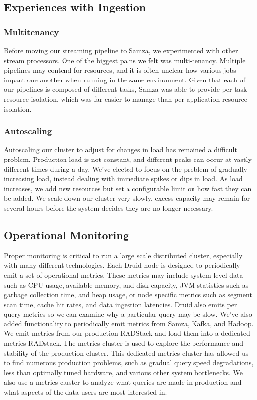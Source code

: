 \documentclass{vldb}
\begin{document}
\subsection{Experiences with Ingestion}
\subsubsection{Multitenancy}
Before moving our streaming pipeline to Samza, we experimented with other
stream processors. One of the biggest pains we felt was multi-tenancy. Multiple
pipelines may contend for resources, and it is often unclear how various jobs
impact one another when running in the same environment. Given that each of our
pipelines is composed of different tasks, Samza was able to provide per task
resource isolation, which was far easier to manage than per application
resource isolation.

\subsubsection{Autoscaling}
Autoscaling our cluster to adjust for changes in load has remained a difficult
problem. Production load is not constant, and different peaks can occur at
vastly different times during a day. We’ve elected to focus on the problem of
gradually increasing load, instead dealing with immediate spikes or dips in
load. As load increases, we add new resources but set a configurable limit on
how fast they can be added. We scale down our cluster very slowly, excess
capacity may remain for several hours before the system decides they are no
longer necessary.

\subsection{Operational Monitoring}
Proper monitoring is critical to run a large scale distributed cluster,
especially with many different technologies. Each Druid node is designed to
periodically emit a set of operational metrics. These metrics may include
system level data such as CPU usage, available memory, and disk capacity, JVM
statistics such as garbage collection time, and heap usage, or node specific
metrics such as segment scan time, cache hit rates, and data ingestion
latencies. Druid also emits per query metrics so we can examine why a
particular query may be slow. We’ve also added functionality to periodically
emit metrics from Samza, Kafka, and Hadoop. We emit metrics from our production
RADStack and load them into a dedicated metrics RADstack. The metrics cluster
is used to explore the performance and stability of the production cluster.
This dedicated metrics cluster has allowed us to find numerous production
problems, such as gradual query speed degradations, less than optimally tuned
hardware, and various other system bottlenecks. We also use a metrics cluster
to analyze what queries are made in production and what aspects of the data
users are most interested in.
\end{document}
